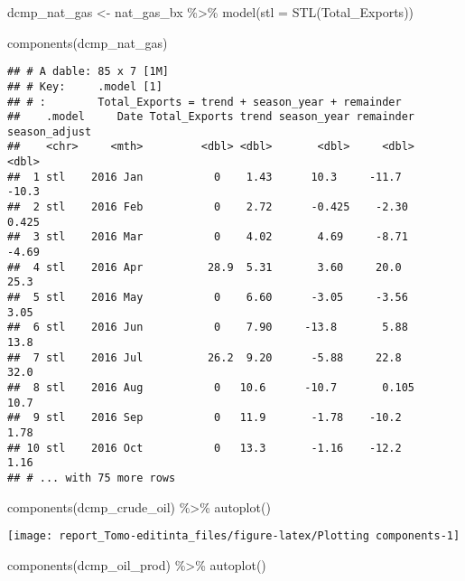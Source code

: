 \documentclass[
]{article}
\newenvironment{Shaded}{\begin{snugshade}}{\end{snugshade}}
\newcommand{\AttributeTok}[1]{\textcolor[rgb]{0.77,0.63,0.00}{#1}}
\newcommand{\FunctionTok}[1]{\textcolor[rgb]{0.00,0.00,0.00}{#1}}
\newcommand{\NormalTok}[1]{#1}
\newcommand{\OtherTok}[1]{\textcolor[rgb]{0.56,0.35,0.01}{#1}}
\newcommand{\SpecialCharTok}[1]{\textcolor[rgb]{0.00,0.00,0.00}{#1}}
\begin{document}
\begin{Shaded}
\begin{Highlighting}[]
\NormalTok{dcmp\_nat\_gas }\OtherTok{\textless{}{-}}\NormalTok{ nat\_gas\_bx }\SpecialCharTok{\%\textgreater{}\%}
  \FunctionTok{model}\NormalTok{(}\AttributeTok{stl =} \FunctionTok{STL}\NormalTok{(Total\_Exports))}

\FunctionTok{components}\NormalTok{(dcmp\_nat\_gas)}
\end{Highlighting}
\end{Shaded}

\begin{verbatim}
## # A dable: 85 x 7 [1M]
## # Key:     .model [1]
## # :        Total_Exports = trend + season_year + remainder
##    .model     Date Total_Exports trend season_year remainder season_adjust
##    <chr>     <mth>         <dbl> <dbl>       <dbl>     <dbl>         <dbl>
##  1 stl    2016 Jan           0    1.43      10.3     -11.7         -10.3  
##  2 stl    2016 Feb           0    2.72      -0.425    -2.30          0.425
##  3 stl    2016 Mar           0    4.02       4.69     -8.71         -4.69 
##  4 stl    2016 Apr          28.9  5.31       3.60     20.0          25.3  
##  5 stl    2016 May           0    6.60      -3.05     -3.56          3.05 
##  6 stl    2016 Jun           0    7.90     -13.8       5.88         13.8  
##  7 stl    2016 Jul          26.2  9.20      -5.88     22.8          32.0  
##  8 stl    2016 Aug           0   10.6      -10.7       0.105        10.7  
##  9 stl    2016 Sep           0   11.9       -1.78    -10.2           1.78 
## 10 stl    2016 Oct           0   13.3       -1.16    -12.2           1.16 
## # ... with 75 more rows
\end{verbatim}

\begin{Shaded}
\begin{Highlighting}[]
\FunctionTok{components}\NormalTok{(dcmp\_crude\_oil) }\SpecialCharTok{\%\textgreater{}\%} \FunctionTok{autoplot}\NormalTok{()}
\end{Highlighting}
\end{Shaded}

\begin{center}\texttt{[image: report\_Tomo-editinta\_files/figure-latex/Plotting components-1]} \end{center}

\begin{Shaded}
\begin{Highlighting}[]
\FunctionTok{components}\NormalTok{(dcmp\_oil\_prod) }\SpecialCharTok{\%\textgreater{}\%} \FunctionTok{autoplot}\NormalTok{()}
\end{Highlighting}
\end{Shaded}
\end{document}
